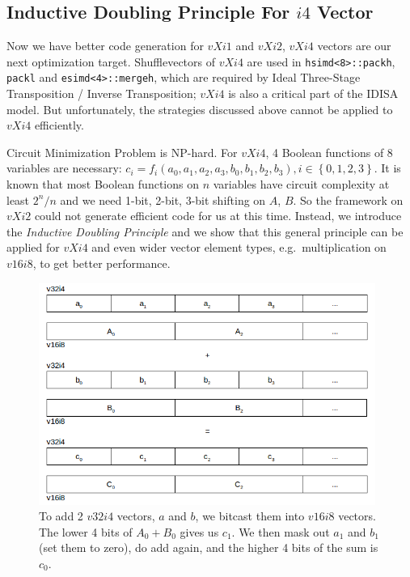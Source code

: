 \subsection{Inductive Doubling Principle For $i4$ Vector}
Now we have better code generation for $vXi1$ and $vXi2$, $vXi4$ vectors are our next optimization target. Shufflevectors of $vXi4$ are used in \verb|hsimd<8>::packh|, \verb|packl| and \verb|esimd<4>::mergeh|, which are required by Ideal Three-Stage Transposition / Inverse Transposition; $vXi4$ is also a critical part of the IDISA model. But unfortunately, the strategies discussed above cannot be applied to $vXi4$ efficiently.

Circuit Minimization Problem is NP-hard\cite{quine1952problem, kabanets2000circuit}. For $vXi4$, 4 Boolean functions of 8 variables are necessary: $c_i = f_i(a_0, a_1, a_2, a_3, b_0, b_1, b_2, b_3), i \in \left\{{0, 1, 2, 3}\right\}$. It is known that most Boolean functions on $n$ variables have circuit complexity at least $2^n/n$ \cite{kabanets2000circuit} and we need 1-bit, 2-bit, 3-bit shifting on $A$, $B$. So the framework on $vXi2$ could not generate efficient code for us at this time. Instead, we introduce the \textit{Inductive Doubling Principle} \cite{inductive_doubling_principle} and we show that this general principle can be applied for $vXi4$ and even wider vector element types, e.g.\ multiplication on $v16i8$, to get better performance.

\begin{figure}[ht!]
\centering
\includegraphics[width=110mm]{draw/add_4.png}
\caption[Addition of two $v32i4$ vectors.]{To add 2 $v32i4$ vectors, $a$ and $b$, we bitcast them into $v16i8$ vectors. The lower 4 bits of $A_0 + B_0$ gives us $c_1$. We then mask out $a_1$ and $b_1$ (set them to zero), do add again, and the higher 4 bits of the sum is $c_0$.}
\label{figure:add_4}
\end{figure}

